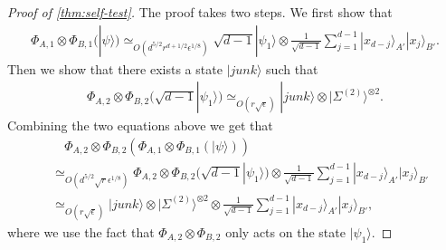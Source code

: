 \documentclass[11pt,letterpaper]{article}
\newcommand{\ket}[1]{|#1\rangle}
\newcommand{\x}{\otimes}
\newcommand{\1}{\mathbb{1}}
\newcommand{\EPR}[1]{\Sigma^{(#1)}}
\newcommand{\ep}{\epsilon}
\newcommand{\se}{\sqrt{\epsilon}}
\newcommand{\sr}{\sqrt{r}}
\newcommand{\appd}[1]{\simeq_{#1}}
\theoremstyle{definition}
\begin{document}
\begin{proof}[Proof of \cref{thm:self-test}]
The proof takes two steps. 
We first show that 
\begin{align}
	\Phi_{A,1}\x\Phi_{B,1}(\ket{\psi}) \appd{O(d^{5/2} r^{d+1/2} \ep^{1/8})} \sqrt{d-1}\ket{\psi_1} \x \frac{1}{\sqrt{d-1}}\sum_{j=1}^{d-1} \ket{x_{d-j}}_{A'}\ket{x_j}_{B'}.
\end{align}
Then we show that there exists a state $\ket{junk}$ such that  
\begin{align}
\label{eq:phi2_result}
\Phi_{A,2} \x \Phi_{B,2} (\sqrt{d-1}\ket{\psi_1}) \appd{O(r\se)} \ket{junk} \x \ket{\EPR{2}}^{\x 2}.
\end{align}
Combining the two equations above we get that 
\begin{align*}
	&\quad\Phi_{A,2} \x \Phi_{B,2}( \Phi_{A,1} \x \Phi_{B,1} (\ket{\psi})) \\
	&\appd{O(d^{5/2} \sr \ep^{1/8})} \Phi_{A,2} \x \Phi_{B,2}(\sqrt{d-1} \ket{\psi_1}) \x\frac{1}{\sqrt{d-1}}\sum_{j=1}^{d-1} \ket{x_{d-j}}_{A'}\ket{x_j}_{B'} \\
	&\appd{O(r\se)} \ket{junk} \x \ket{\EPR{2}}^{\x 2} \x\frac{1}{\sqrt{d-1}}\sum_{j=1}^{d-1} \ket{x_{d-j}}_{A'}\ket{x_j}_{B'},
\end{align*}
where we use the fact that $\Phi_{A,2}\x \Phi_{B,2}$ only acts on the state $\ket{\psi_1}$.


\end{proof}
\end{document}
